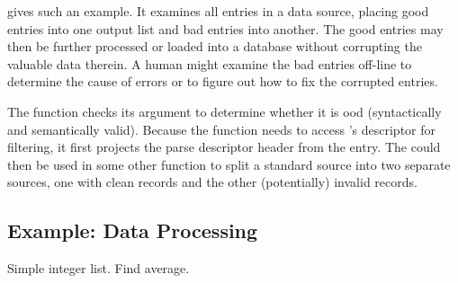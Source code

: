  gives such an example.  It examines all
entries in a \dibbler{} data source, placing good entries into one
output list and bad entries into another.  The good entries may then
be further processed or loaded into a database without corrupting the
valuable data therein.  A human might examine the bad entries off-line
to determine the cause of errors or to figure out how to fix the
corrupted entries.

The  function checks its argument  to
determine whether it is ood (syntactically and semantically
valid).  Because the function needs to access 's descriptor for
filtering, it first projects the parse descriptor header from the
entry.  The  could then be used in some other function
to split a standard \dibbler{} source into two separate sources, one
with clean records and the other (potentially) invalid records.


\subsection{Example: Data Processing}
\label{sec:ex-process}

Simple integer list. Find average.

